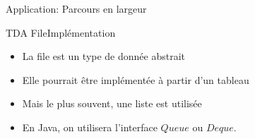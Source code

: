 \documentclass[12pt,a4paper]{beamer}
\begin{document}
\begin{frame}{Application: \textcolor{blueemph}{Parcours en largeur}}
{\begin{figure}
\end{figure}
}
\end{frame}


\begin{frame}{TDA File}{Implémentation}

\begin{itemize}
\item La file est un type de donnée abstrait
\item Elle pourrait être implémentée à partir d'un tableau
\item Mais le plus souvent, une liste est utilisée
\item En \textcolor{blueemph}{Java}, on utilisera l'interface $Queue$ ou $Deque$.
\end{itemize}


\end{frame}
\end{document}
